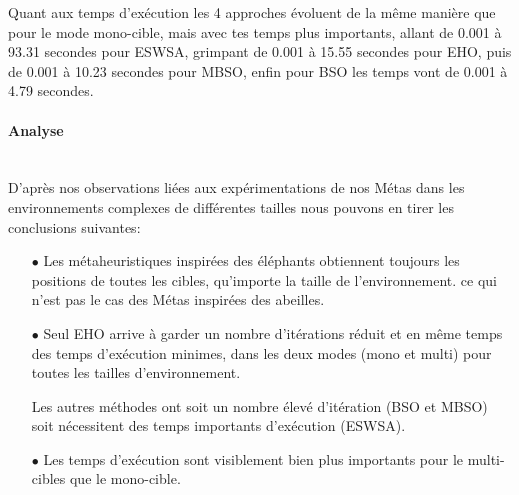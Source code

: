 	Quant aux temps d'exécution les 4 approches évoluent de la même manière que pour le mode mono-cible, mais avec tes temps plus importants, allant de 0.001 à 93.31 secondes pour ESWSA, grimpant de 0.001 à 15.55 secondes pour EHO, puis de 0.001 à 10.23 secondes pour MBSO, enfin pour BSO les temps vont de 0.001 à 4.79 secondes.



\noindent
\begin{minipage}[t]{0.55\textwidth}
	\captionsetup{width=0.8\linewidth}
	\centering{}
	\label{IS5c}
\end{minipage}\hfill
\begin{minipage}[t]{0.55\textwidth}
	\captionsetup{width=0.8\linewidth}
	\centering{}
	\label{tS5c}
\end{minipage}\hfill




\paragraph{Analyse}
\textbf{ }\\
D'après nos observations liées aux expérimentations de nos Métas dans les environnements complexes de différentes tailles nous pouvons en tirer les conclusions suivantes:
\begin{itemize}
	\item[$\bullet$] Les métaheuristiques inspirées des éléphants obtiennent toujours les positions de toutes les cibles, qu'importe la taille de l'environnement. ce qui n'est pas le cas des Métas inspirées des abeilles.
	\item[$\bullet$] Seul EHO arrive à garder un nombre d'itérations réduit et en même temps des temps d'exécution minimes, dans les deux modes (mono et multi) pour toutes les tailles d'environnement.
	
	Les autres méthodes ont soit un nombre élevé d'itération (BSO et MBSO) soit nécessitent des temps importants d'exécution (ESWSA).
	\item[$\bullet$] Les temps d'exécution sont visiblement bien plus importants pour le multi-cibles que le mono-cible.
\end{itemize}



